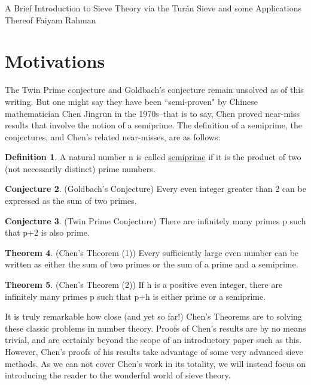 \documentclass[12pt,twoside]{article}
\theoremstyle{definition}
\newtheorem{semip}{Definition}[section]
\theoremstyle{theorem}
\newtheorem{GC}[semip]{Conjecture}
\newtheorem{TP}[semip]{Conjecture}
\newtheorem{CT1}[semip]{Theorem}
\newtheorem{CT2}[semip]{Theorem}
\theoremstyle{definition}
\theoremstyle{theorem}
\begin{document}
\begin{titlepage}
\begin{center}
\vspace*{2in}
{\Huge A Brief Introduction to Sieve Theory via the Tur\'an Sieve and some Applications Thereof}
\vspace*{2in}
   {\large {} Faiyam Rahman}
\end{center}
\end{titlepage}
\section{Motivations}
\qquad The Twin Prime conjecture and Goldbach's conjecture remain unsolved as of this writing. But one might say they have been ``semi-proven" by Chinese mathematician Chen Jingrun in the 1970s--that is to say, Chen proved near-miss results that involve the notion of a  semiprime. The definition of a semiprime, the conjectures, and Chen's related near-misses, are as follows:
\begin{semip}
A natural number n is called \underline{semiprime} if it is the product of two (not necessarily distinct) prime numbers.
\end{semip}
\begin{GC}
(Goldbach's Conjecture) Every even integer greater than 2 can be expressed as the sum of two primes.
\end{GC}
\begin{TP}
(Twin Prime Conjecture) There are infinitely many primes p such that p+2 is also prime.
\end{TP}
\begin{CT1}
(Chen's Theorem (1)) Every sufficiently large even number can be written as either the sum of two primes or the sum of a prime and a semiprime.
\end{CT1}
\begin{CT2}
(Chen's Theorem (2)) If h is a positive even integer, there are infinitely many primes p such that p+h is either prime or a semiprime.
\end{CT2}
It is truly remarkable how close (and yet so far!) Chen's Theorems are to solving these classic problems in number theory. Proofs of Chen's results are by no means trivial, and are certainly beyond the scope of an introductory paper such as this. However, Chen's proofs of his results take advantage of some very advanced sieve methods. As we can not cover Chen's work in its totality, we will instead focus on introducing the reader to the wonderful world of sieve theory. 
\end{document}
